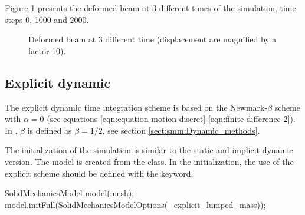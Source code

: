 Figure \ref{fig:smm:implicit:dynamic_solution} presents the deformed
beam at 3 different times of the simulation, time steps 0, 1000 and
2000.

\begin{figure}[!htb] 
  \centering 
  \setlength{\unitlength}{0.1\textwidth}

  \caption{Deformed beam at 3 different time (displacement are
    magnified by a factor 10).}
  \label{fig:smm:implicit:dynamic_solution}
\end{figure}

\subsection{Explicit dynamic}

The explicit dynamic time integration scheme is based on the
Newmark-$\beta$ scheme with $\alpha=0$ (see equations
\ref{eqn:equation-motion-discret}-\ref{eqn:finite-difference-2}).  In
\akantu, $\beta$ is defined as $\beta=1/2$, see section
\ref{sect:smm:Dynamic_methods}.

The initialization of the simulation is similar to the static and
implicit dynamic version.  The model is created from the
 class.  In the initialization, the use of
the explicit scheme should be defined with the
 keyword.

\begin{cpp} 
SolidMechanicsModel model(mesh);
model.initFull(SolidMechanicsModelOptions(_explicit_lumped_mass));
\end{cpp} 

